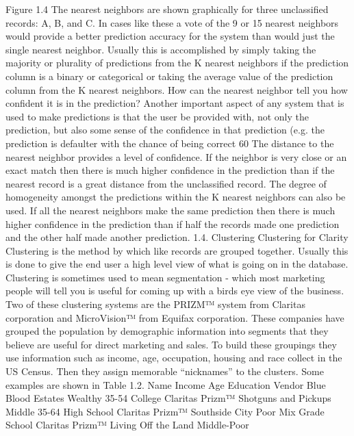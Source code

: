 Figure 1.4  The nearest neighbors are shown graphically for three unclassified records: A, B, and C.
In cases like these a vote of the 9 or 15 nearest neighbors would provide a better prediction accuracy for the system than would just the single nearest neighbor.  Usually this is accomplished by simply taking the majority or plurality of predictions from the K nearest neighbors if the prediction column is a binary or categorical or taking the average value of the prediction column from the K nearest neighbors.
How can the nearest neighbor tell you how confident it is in the prediction?
Another important aspect of any system that is used to make predictions is that the user be provided with, not only the prediction, but also some sense of the confidence in that prediction (e.g. the prediction is defaulter with the chance of being correct 60%
The distance to the nearest neighbor provides a level of confidence.  If the neighbor is very close or an exact match then there is much higher confidence in the prediction than if the nearest record is a great distance from the unclassified record.
The degree of homogeneity amongst the predictions within the K nearest neighbors can also be used.  If all the nearest neighbors make the same prediction then there is much higher confidence in the prediction than if half the records made one prediction and the other half made another prediction.
1.4. Clustering
Clustering for Clarity
Clustering is the method by which like records are grouped together.  Usually this is done to give the end user a high level view of what is going on in the database.  Clustering is sometimes used to mean segmentation - which most marketing people will tell you is useful for coming up with a birds eye view of the business.  Two of these clustering systems are the PRIZM™ system from Claritas corporation and MicroVision™ from Equifax corporation.  These companies have grouped the population by demographic information into segments that they believe are useful for direct marketing and sales.  To build these groupings they use information such as income, age, occupation, housing and race collect in the US Census.  Then they assign memorable “nicknames” to the clusters.  Some examples are shown in Table 1.2. 
Name
Income
Age
Education       
Vendor
Blue Blood Estates
Wealthy
35-54
College
Claritas Prizm™
Shotguns and Pickups
Middle
35-64
High School
Claritas Prizm™
Southside City 
Poor
Mix
Grade School
Claritas Prizm™
Living Off the Land
Middle-Poor
